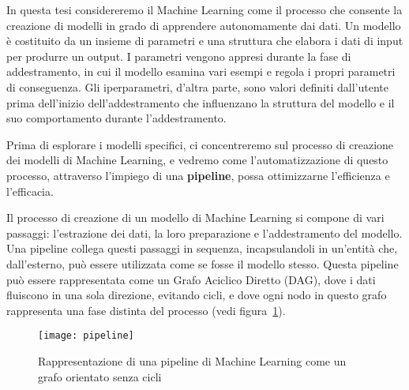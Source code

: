 \label{chap:machine_learning}

In questa tesi considereremo il Machine Learning come il processo che consente
la creazione di modelli in grado di apprendere autonomamente dai dati. Un
modello è costituito da un insieme di parametri e una struttura che elabora i
dati di input per produrre un output. I parametri vengono appresi durante la
fase di addestramento, in cui il modello esamina vari esempi e regola i propri
parametri di conseguenza. Gli iperparametri, d'altra parte, sono valori
definiti dall'utente prima dell'inizio dell'addestramento che influenzano la
struttura del modello e il suo comportamento durante l'addestramento.

Prima di esplorare i modelli specifici, ci concentreremo sul processo di
creazione dei modelli di Machine Learning, e vedremo come l'automatizzazione
di questo processo, attraverso l'impiego di una \textbf{pipeline}, possa
ottimizzarne l'efficienza e l'efficacia.

Il processo di creazione di un modello di Machine Learning si compone di vari
passaggi: l'estrazione dei dati, la loro preparazione e l'addestramento del
modello. Una pipeline collega questi passaggi in sequenza,
incapsulandoli in un'entità che, dall'esterno, può essere utilizzata come se
fosse il modello stesso. Questa pipeline può essere rappresentata come un
Grafo Aciclico Diretto (DAG), dove i dati fluiscono in una sola direzione,
evitando cicli, e dove ogni nodo in questo grafo rappresenta una fase distinta
del processo (vedi figura~\ref{fig:ml_pipeline_dag}).

\begin{figure}[!ht]
    \centering
    \texttt{[image: pipeline]}
    \caption{Rappresentazione di una pipeline di Machine Learning come un
    grafo orientato senza cicli}
    \label{fig:ml_pipeline_dag}
\end{figure}

